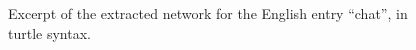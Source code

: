 \documentclass[10pt, a4paper]{article}
\begin{document}
\begin{figure}[htb]
\caption{Excerpt of the extracted network for the English entry ``chat'', in turtle syntax.}
\label{extr:chatrdfen}
\end{figure}
\end{document}
